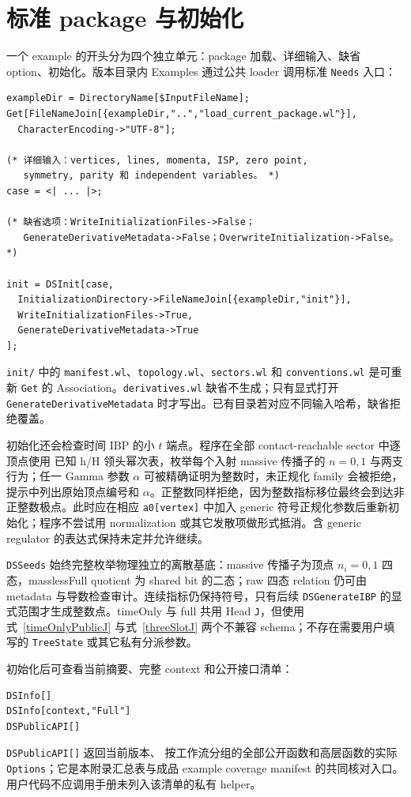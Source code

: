 ﻿\documentclass[a4paper,11pt]{article}
\begin{document}
\section{标准 package 与初始化}

一个 example 的开头分为四个独立单元：package 加载、详细输入、缺省 option、初始化。版本目录内 Examples 通过公共 loader 调用标准 \texttt{Needs} 入口：
\begin{verbatim}
exampleDir = DirectoryName[$InputFileName];
Get[FileNameJoin[{exampleDir,"..","load_current_package.wl"}],
  CharacterEncoding->"UTF-8"];

(* 详细输入：vertices, lines, momenta, ISP, zero point,
   symmetry, parity 和 independent variables。 *)
case = <| ... |>;

(* 缺省选项：WriteInitializationFiles->False；
   GenerateDerivativeMetadata->False；OverwriteInitialization->False。 *)

init = DSInit[case,
  InitializationDirectory->FileNameJoin[{exampleDir,"init"}],
  WriteInitializationFiles->True,
  GenerateDerivativeMetadata->True
];
\end{verbatim}

\texttt{init/} 中的 \texttt{manifest.wl}、\texttt{topology.wl}、\texttt{sectors.wl} 和 \texttt{conventions.wl} 是可重新 \texttt{Get} 的 Association。\texttt{derivatives.wl} 缺省不生成；只有显式打开 \texttt{GenerateDerivativeMetadata} 时才写出。已有目录若对应不同输入哈希，缺省拒绝覆盖。

初始化还会检查时间 IBP 的小 $t$ 端点。程序在全部 contact-reachable sector 中逐顶点使用
已知 h/H 领头幂次表，枚举每个入射 massive 传播子的 $n=0,1$ 与两支行为；任一 Gamma 参数
$\alpha$ 可被精确证明为整数时，未正规化 family 会被拒绝，提示中列出原始顶点编号和
$\alpha$。正整数同样拒绝，因为整数指标移位最终会到达非正整数极点。此时应在相应
\texttt{a0[vertex]} 中加入 generic 符号正规化参数后重新初始化；程序不尝试用 normalization
或其它发散项做形式抵消。含 generic regulator 的表达式保持未定并允许继续。

\texttt{DSSeeds} 始终完整枚举物理独立的离散基底：massive 传播子为顶点 $n_i=0,1$ 四态，masslessFull quotient 为 shared bit 的二态；raw 四态 relation 仍可由 metadata 与导数检查审计。连续指标仍保持符号，只有后续 \texttt{DSGenerateIBP} 的显式范围才生成整数点。timeOnly 与 full 共用 Head \texttt{J}，但使用式~\eqref{timeOnlyPublicJ} 与式~\eqref{threeSlotJ} 两个不兼容 schema；不存在需要用户填写的 \texttt{TreeState} 或其它私有分派参数。

初始化后可查看当前摘要、完整 context 和公开接口清单：
\begin{verbatim}
DSInfo[]
DSInfo[context,"Full"]
DSPublicAPI[]
\end{verbatim}
\texttt{DSPublicAPI[]} 返回当前版本、
按工作流分组的全部公开函数和高层函数的实际 \texttt{Options}；它是本附录汇总表与成品
example coverage manifest 的共同核对入口。用户代码不应调用手册未列入该清单的私有 helper。
\end{document}
